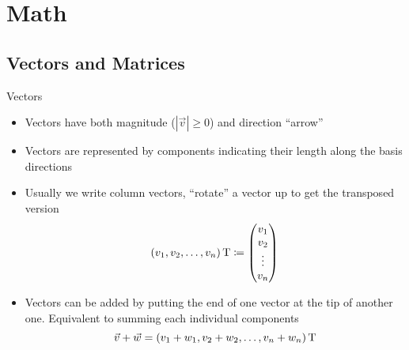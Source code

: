 

\subtitle{Part I -- Math and Minimizers\\\vspace*{1.5ex}
  \small \textbf{Goal:} Give a short reminder of the underlying math of machine learning algorithms
}


  
  \maketitle

  \section{Math}

  \subsection{Vectors and Matrices}

  \begin{frame}{Vectors}
    \begin{itemize}
      \item Vectors have both magnitude ($|\vec{v}| \geq 0$) and direction
        \rightarrow \enquote{arrow}
      \item Vectors are represented by components indicating their length
        along the basis directions
      \item Usually we write column vectors,
        \enquote{rotate} a vector up to get the transposed version
        \begin{equation*}
          \left(v_1, v_2, \dots, v_n\right)\text{T} \coloneqq
          \begin{pmatrix} v_1 \\ v_2 \\ \vdots \\ v_n \end{pmatrix}
        \end{equation*}
      \item Vectors can be added by putting the end of one vector at the tip
        of another one. Equivalent to summing each individual components
        \begin{equation*}
          \vec{v} + \vec{w} =
            \left(v_1 + w_1, v_2 + w_2, \dots, v_n + w_n\right)\text{T}
        \end{equation*}
    \end{itemize}
  \end{frame}

